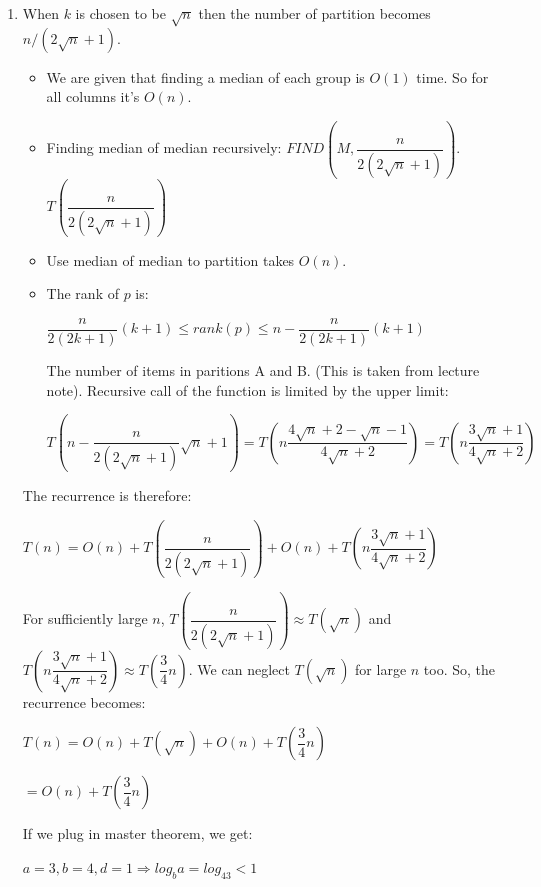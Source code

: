 \documentclass{article}
\begin{document}
\begin{enumerate}
\begin{lstlisting}
  \end{lstlisting}
  \item When $k$ is chosen to be $\sqrt{n}$ then the number of partition becomes $n/(2\sqrt{n}+1)$.
  
  \begin{itemize}
    \item We are given that finding a median of each group is $O(1)$ time. So for all columns it's $O(n)$.
    \item Finding median of median recursively: $FIND(M,\dfrac{n}{2(2\sqrt{n}+1)})$. $T(\dfrac{n}{2(2\sqrt{n}+1)})$
    \item Use median of median to partition takes $O(n)$.
    \item The rank of $p$ is:
    \begin{center}
      $\dfrac{n}{2(2k+1)}(k+1)\leq rank(p) \leq n-\dfrac{n}{2(2k+1)}(k+1)$
    \end{center}

    The number of items in paritions A and B. (This is taken from lecture note).
    Recursive call of the function is limited by the upper limit:
    
    \begin{center}
      $T(n-\dfrac{n}{2(2\sqrt{n}+1)}\sqrt{n}+1)=T(n\dfrac{4\sqrt{n}+2-\sqrt{n}-1}{4\sqrt{n}+2})=T(n\dfrac{3\sqrt{n}+1}{4\sqrt{n}+2})$
    \end{center}

  \end{itemize}

  The recurrence is therefore:

  \begin{center}
    $T(n)=O(n)+T(\dfrac{n}{2(2\sqrt{n}+1)})+O(n)+T(n\dfrac{3\sqrt{n}+1}{4\sqrt{n}+2})$
  \end{center}

  For sufficiently large $n$, $T(\dfrac{n}{2(2\sqrt{n}+1)})\approx T(\sqrt{n})$ and $T(n\dfrac{3\sqrt{n}+1}{4\sqrt{n}+2})\approx T(\dfrac{3}{4}n)$.
  We can neglect $T(\sqrt{n})$ for large $n$ too.
  So, the recurrence becomes:

  \begin{center}
    $T(n)=O(n)+T(\sqrt{n})+O(n)+T(\dfrac{3}{4}n)$

    $=O(n)+T(\dfrac{3}{4}n)$
  \end{center}

  If we plug in master theorem, we get:

  $a=3, b=4, d=1 \Rightarrow log_ba=log_43<1$


\end{enumerate}
\end{document}
